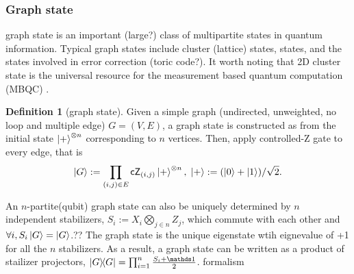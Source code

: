 \documentclass[
aps,
pra,
floatfix,
]{revtex4-2}
\theoremstyle{plain}
\theoremstyle{definition}
\newtheorem{definition}{Definition}
\newtheorem{remark}{Remark}
\begin{document}


\subsubsection{Graph state}\label{sec:graph_state}
graph state is an important (large?) class of multipartite states in quantum information.
Typical graph states include cluster (lattice) states,  states, and the states involved in error correction (toric code?).
It worth noting that 2D cluster state is the universal resource for the measurement based quantum computation (MBQC) \cite{briegelMeasurementbasedQuantumComputation2009}.
\begin{definition}[graph state]\label{def:graph_state}
	Given a simple graph (undirected, unweighted, no loop and multiple edge) $G=(V,E)$, a graph state is constructed as 
	from the initial state $\ket{+}^{\otimes n}$ corresponding to $n$ vertices.
	Then, apply controlled-Z gate to every edge, that is 
	\begin{equation}
		\ket{G}:=\prod_{(i,j)\in E}\textsf{cZ}_{(i,j)} \ket{+}^{\otimes n}
		,\;\ket{+}: = (\ket{0}+\ket{1})/\sqrt{2} .
	\end{equation}
\end{definition}
An $n$-partite(qubit) graph state can also be uniquely determined by $n$ independent stabilizers, 
$S_i:= X_i \bigotimes_{j\in n}Z_j$, 
which commute with each other and $\forall i,S_i\ket{G}=\ket{G}$.??
The graph state is the unique eigenstate wtih eignevalue of +1 for all the $n$ stabilizers.
As a result, a graph state can be written as a product of stailizer projectors, $\op{G}=\prod_{i=1}^n \frac{S_i +\identity}{2}$.
 formalism
\end{document}
